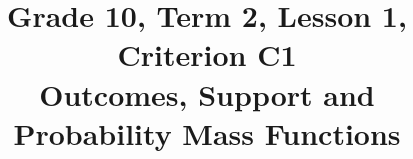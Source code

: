 \usepackage{needspace}
\setlength{\emergencystretch}{2em}
\title{Grade 10, Term 2, Lesson 1, Criterion C1\\Outcomes, Support and Probability Mass Functions}
\author{}
\date{}
\newcommand{\taskheading}[1]{%
    \textbf{Task #1. \ifcase#1\or
    Identify the outcomes and their probabilities.\or
    Define variables and units; map, list support, build and check PMFs.\or
    Find and interpret a requested probability.\fi}%
}
\newcommand{\problemTasks}[5]{%
    \Needspace{10\baselineskip}%
    \QuestionsTasks[#1]{%
        {1}/{#2-1}/{\taskheading{1} #3},
        {1}/{#2-2}/{\taskheading{2} #4},
        {1}/{#2-3}/{\taskheading{3} #5}%
    }%
}
\newcommand{\contextTasks}[4]{%
    \TaskHyperref{#1-1}{\taskheading{1}} #2\par\smallskip
    \TaskHyperref{#1-2}{\taskheading{2}} #3\par\smallskip
    \TaskHyperref{#1-3}{\taskheading{3}} #4%
}
\newcommand{\workedsolution}[1]{%
    \Needspace{8\baselineskip}%
    \subsubsection*{Complete worked solution}\label{#1}%
}
\newcommand{\solutiontask}[2]{%
    \par\medskip\Needspace{5\baselineskip}\phantomsection\label{#1-#2}%
    \noindent\taskheading{#2}\par\nopagebreak
}

